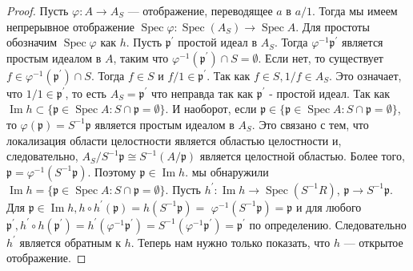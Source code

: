 \begin{proof}
Пусть $\varphi: A \rightarrow A_S$ — отображение, переводящее $a$ в $a/1$. Тогда мы имеем непрерывное отображение $\operatorname{Spec} \varphi: \operatorname{Spec}\left(A_S\right) \rightarrow \operatorname{Spec} A$. Для простоты обозначим $\operatorname{Spec} \varphi$ как $h$. Пусть $\mathfrak{p}^{\prime}$ простой идеал в $A_S$. Тогда $\varphi^{-1} \mathfrak{p}^{\prime}$ является простым идеалом в $A$, таким что $\varphi^{-1}\left(\mathfrak{p}^{\prime}\right) \cap S=\emptyset$. Если нет, то существует $f \in \varphi^{-1}\left(\mathfrak{p}^{\prime}\right) \cap S$. Тогда $f \in S$ и $f / 1 \in \mathfrak{p}^{\prime}$. Так как $f \in S, 1 / f \in A_S$. Это означает, что $1 / 1 \in \mathfrak{p}^{\prime}$, то есть $A_S=\mathfrak{p}^{\prime}$ что неправда так как $\mathfrak{p}^{\prime}$ - простой идеал. Так как $\operatorname{Im} h \subset\{\mathfrak{p} \in \operatorname{Spec} A: S \cap \mathfrak{p}=\emptyset\}$. И наоборот, если $\mathfrak{p} \in\{\mathfrak{p} \in \operatorname{Spec} A: S \cap \mathfrak{p}=\emptyset\}$, то $\varphi(\mathfrak{p})=S^{-1} \mathfrak{p}$ является простым идеалом в $A_S$. Это связано с тем, что локализация области целостности является областью целостности и, следовательно, $A_S / S^{-1} \mathfrak{p} \cong S^{-1}(A / \mathfrak{p})$ является целостной областью. Более того, $\mathfrak{p}=\varphi^{-1}\left(S^{-1} \mathfrak{p}\right)$. Поэтому $\mathfrak{p} \in \operatorname{Im} h$. мы обнаружили $\operatorname{Im} h=\{\mathfrak{p} \in \operatorname{Spec} A: S \cap \mathfrak{p}=\emptyset\}$.
\vskip 0.1in
Пусть $h^{\prime}: \operatorname{Im} h \rightarrow \operatorname{Spec}\left(S^{-1} R\right)$, $\mathfrak{p} \rightarrow S^{-1} \mathfrak{p}$. Для $\mathfrak{p} \in \operatorname{Im} h, h \circ h^{\prime}(\mathfrak{p})=h\left(S^{-1} \mathfrak{p}\right)=$ $\varphi^{-1}\left(S^{-1} \mathfrak{p}\right)=\mathfrak{p}$ и для любого $\mathfrak{p}^{\prime}, h^{\prime} \circ h\left(\mathfrak{p}^{\prime}\right)=h^{\prime}\left(\varphi^{-1} \mathfrak{p}^{\prime}\right)=S^{-1}\left(\varphi^{-1} \mathfrak{p}^{\prime}\right)=\mathfrak{p}^{\prime}$ по определению. Следовательно $h^{\prime}$ является обратным к $h$. Теперь нам нужно только показать, что $h$ — открытое отображение.
\vskip 0.1in

\end{proof}
